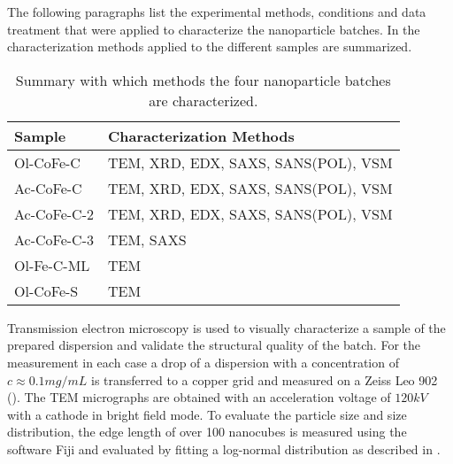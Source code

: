 \documentclass[\main/dresen_thesis.tex]{subfiles}
\begin{document}
  \label{sec:monolayers:nanoparticle:structuralCharacterization}
  The following paragraphs list the experimental methods, conditions and data treatment that were applied to characterize the nanoparticle batches.
  In  the characterization methods applied to the different samples are summarized.

  \begin{table}[!htbp]
    \centering
    \caption{\label{tab:monolayers:nanoparticles:charMethod:overview}Summary with which methods the four nanoparticle batches are characterized.}
    \begin{tabular}{ l | l }
      \textbf{Sample} & \textbf{Characterization Methods}\\
      \hline
      Ol-CoFe-C   & TEM, XRD, EDX, SAXS, SANS(POL), VSM \\
      Ac-CoFe-C   & TEM, XRD, EDX, SAXS, SANS(POL), VSM \\
      Ac-CoFe-C-2 & TEM, XRD, EDX, SAXS, SANS(POL), VSM \\
      Ac-CoFe-C-3 & TEM, SAXS \\
      Ol-Fe-C-ML  & TEM \\
      Ol-CoFe-S   & TEM \\
      \hline
    \end{tabular}
  \end{table}

    Transmission electron microscopy is used to visually characterize a sample of the prepared dispersion and validate the structural quality of the batch.
    For the measurement in each case a drop of a dispersion with a concentration of $c \approx 0.1 \unit{mg/mL}$ is transferred to a copper grid and measured on a Zeiss Leo 902 ().
    The TEM micrographs are obtained with an acceleration voltage of $120 \unit{kV}$ with a  cathode in bright field mode.
    To evaluate the particle size and size distribution, the edge length of over 100 nanocubes is measured using the software Fiji \cite{Schindelin_2012_Fijia} and evaluated by fitting a log-normal distribution as described in .
\end{document}
